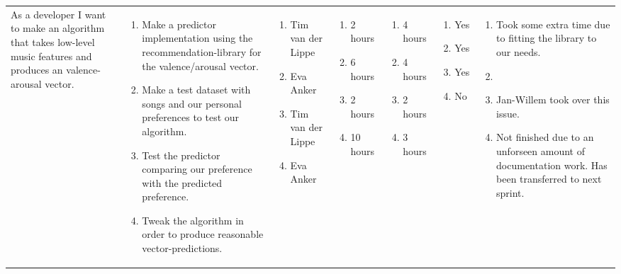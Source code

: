 \documentclass[11pt,a4paper,landscape]{article}
\begin{document}
\begin{table}[h]
\begin{tabular}{|p{3cm}|p{5.0cm}|p{3.0cm}|p{2.2cm}|p{2.2cm}|p{2.0cm}|p{5cm}}
As a developer I want to make an algorithm that takes low-level music features and produces an valence-arousal vector.
&
\begin{enumerate}
\item Make a predictor implementation using the recommendation-library for the valence/arousal vector.
\item Make a test dataset with songs and our personal preferences to test our algorithm.
\item Test the predictor comparing our preference with the predicted preference.
\item Tweak the algorithm in order to produce reasonable vector-predictions.
\end{enumerate}

&
\begin{enumerate}
\item Tim van der Lippe
\item Eva Anker
\item Tim van der Lippe
\item Eva Anker
\end{enumerate}

&

\begin{enumerate}
\item 2 hours
\item 6 hours
\item 2 hours
\item 10 hours
\end{enumerate}

&
\begin{enumerate}
\item 4 hours
\item 4 hours
\item 2 hours
\item 3 hours
\end{enumerate}

&
\begin{enumerate}
\item Yes
\item Yes
\item Yes
\item No
\end{enumerate}
&
\begin{enumerate}
\item Took some extra time due to fitting the library to our needs.
\item 
\item Jan-Willem took over this issue.
\item Not finished due to an unforseen amount of documentation work. Has been transferred to next sprint.
\end{enumerate}

\end{tabular}
\end{table}
\end{document}
